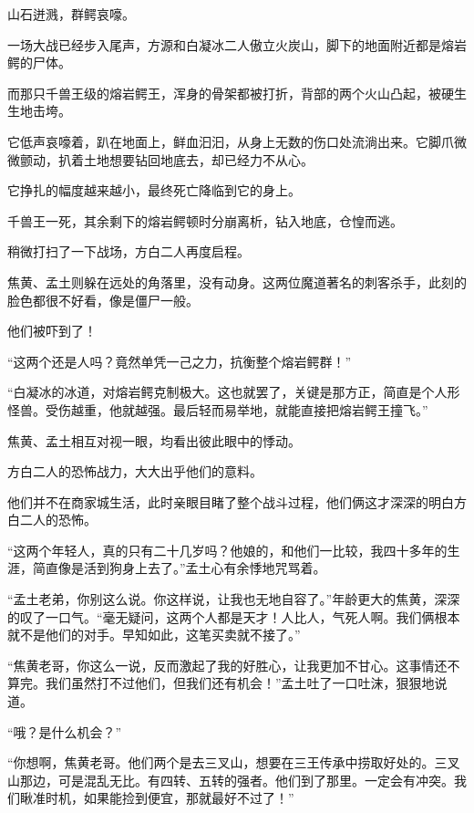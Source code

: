 
\begin{this_body}

山石迸溅，群鳄哀嚎。

一场大战已经步入尾声，方源和白凝冰二人傲立火炭山，脚下的地面附近都是熔岩鳄的尸体。

而那只千兽王级的熔岩鳄王，浑身的骨架都被打折，背部的两个火山凸起，被硬生生地击垮。

它低声哀嚎着，趴在地面上，鲜血汩汩，从身上无数的伤口处流淌出来。它脚爪微微颤动，扒着土地想要钻回地底去，却已经力不从心。

它挣扎的幅度越来越小，最终死亡降临到它的身上。

千兽王一死，其余剩下的熔岩鳄顿时分崩离析，钻入地底，仓惶而逃。

稍微打扫了一下战场，方白二人再度启程。

焦黄、孟土则躲在远处的角落里，没有动身。这两位魔道著名的刺客杀手，此刻的脸色都很不好看，像是僵尸一般。

他们被吓到了！

“这两个还是人吗？竟然单凭一己之力，抗衡整个熔岩鳄群！”

“白凝冰的冰道，对熔岩鳄克制极大。这也就罢了，关键是那方正，简直是个人形怪兽。受伤越重，他就越强。最后轻而易举地，就能直接把熔岩鳄王撞飞。”

焦黄、孟土相互对视一眼，均看出彼此眼中的悸动。

方白二人的恐怖战力，大大出乎他们的意料。

他们并不在商家城生活，此时亲眼目睹了整个战斗过程，他们俩这才深深的明白方白二人的恐怖。

“这两个年轻人，真的只有二十几岁吗？他娘的，和他们一比较，我四十多年的生涯，简直像是活到狗身上去了。”孟土心有余悸地咒骂着。

“孟土老弟，你别这么说。你这样说，让我也无地自容了。”年龄更大的焦黄，深深的叹了一口气。“毫无疑问，这两个人都是天才！人比人，气死人啊。我们俩根本就不是他们的对手。早知如此，这笔买卖就不接了。”

“焦黄老哥，你这么一说，反而激起了我的好胜心，让我更加不甘心。这事情还不算完。我们虽然打不过他们，但我们还有机会！”孟土吐了一口吐沫，狠狠地说道。

“哦？是什么机会？”

“你想啊，焦黄老哥。他们两个是去三叉山，想要在三王传承中捞取好处的。三叉山那边，可是混乱无比。有四转、五转的强者。他们到了那里。一定会有冲突。我们瞅准时机，如果能捡到便宜，那就最好不过了！”


\end{this_body}
